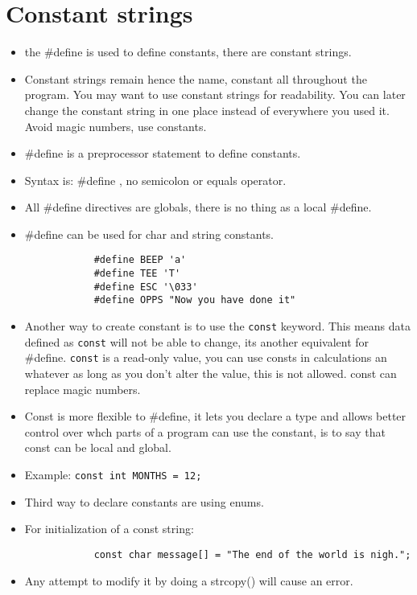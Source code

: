\section{Constant strings} 
\begin{itemize}
    \item the \#define is used to define constants, there are constant strings. 
    \item Constant strings remain hence the name, constant all throughout the program. You may want to use constant strings for readability. You can later change the constant string in one place instead of everywhere you used it. Avoid magic numbers, use constants. 
    \item \#define is a preprocessor statement to define constants. 
    \item Syntax is: \#define  , no semicolon or equals operator. 
    \item All \#define directives are globals, there is no thing as a local \#define.
    \item \#define can be used for char and string constants. 
        \begin{verbatim}
            #define BEEP 'a'
            #define TEE 'T'
            #define ESC '\033'
            #define OPPS "Now you have done it" 
        \end{verbatim}
    
    \item Another way to create constant is to use the \texttt{const} keyword. This means data defined as \texttt{const} will not be able to change, its another equivalent for \#define. \verb|const| is a read-only value, you can use consts in calculations an whatever as long as you don't alter the value, this is not allowed. const can replace magic numbers. 
    \item Const is more flexible to \#define, it lets you declare a type and allows better control over whch parts of a program can use the constant, is to say that const can be local and global. 
    \item Example: \texttt{const int MONTHS = 12;}
    \item Third way to declare constants are using enums. 
    \item For initialization of a const string:
        \begin{verbatim}
            const char message[] = "The end of the world is nigh.";
        \end{verbatim}
    
    \item Any attempt to modify it by doing a strcopy() will cause an error. 
\end{itemize}


